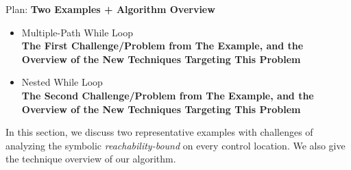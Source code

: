 Plan:
\textbf{Two Examples + Algorithm Overview}
\begin{itemize}
\item {Multiple-Path While Loop}
\\
\textbf{The First Challenge/Problem from The Example, 
and the Overview of the New Techniques Targeting This Problem}
\item {Nested While Loop}
\\
\textbf{The Second Challenge/Problem from The Example,
and the Overview of the New Techniques Targeting This Problem}
\end{itemize}
In this section, we discuss two representative examples with
challenges of analyzing the symbolic
\emph{reachability-bound} on
every control location.
We also give the technique overview of our algorithm.
%
